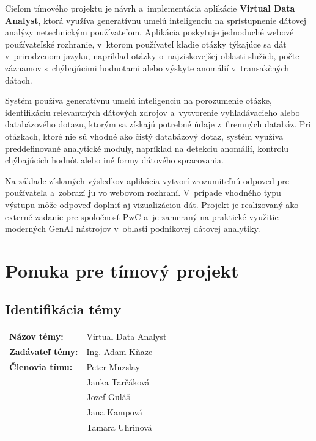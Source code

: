 \documentclass[a4paper, 12pt]{article}
\begin{document}
Cieľom tímového projektu je návrh a~implementácia aplikácie \textbf{Virtual Data Analyst}, ktorá využíva generatívnu umelú inteligenciu na sprístupnenie dátovej analýzy netechnickým používateľom. Aplikácia poskytuje jednoduché webové používateľské rozhranie, v~ktorom používateľ kladie otázky týkajúce sa dát v~prirodzenom jazyku, napríklad otázky o~najziskovejšej oblasti služieb, počte záznamov s~chýbajúcimi hodnotami alebo výskyte anomálií v~transakčných dátach.

Systém používa generatívnu umelú inteligenciu na porozumenie otázke, identifikáciu relevantných dátových zdrojov a~vytvorenie vyhľadávacieho alebo databázového dotazu, ktorým sa získajú potrebné údaje z~firemných databáz. Pri otázkach, ktoré nie sú vhodné ako čistý databázový dotaz, systém využíva preddefinované analytické moduly, napríklad na detekciu anomálií, kontrolu chýbajúcich hodnôt alebo iné formy dátového spracovania.

Na základe získaných výsledkov aplikácia vytvorí zrozumiteľnú odpoveď pre používateľa a~zobrazí ju vo webovom rozhraní. V~prípade vhodného typu výstupu môže odpoveď doplniť aj vizualizáciou dát. Projekt je realizovaný ako externé zadanie pre spoločnosť PwC a~je zameraný na praktické využitie moderných GenAI nástrojov v~oblasti podnikovej dátovej analytiky.

\clearpage
\section*{Ponuka pre tímový projekt}

\subsection*{Identifikácia témy}

\begin{tabular}{ll}
\textbf{Názov témy:} & Virtual Data Analyst \\
\textbf{Zadávateľ témy:} & Ing. Adam Kňaze \\
\textbf{Členovia tímu:} & Peter Muzslay \\
                     & Janka Tarčáková \\
                     & Jozef Guláš \\
                     & Jana Kampová \\
                     & Tamara Uhrinová \\
\end{tabular}
\end{document}
